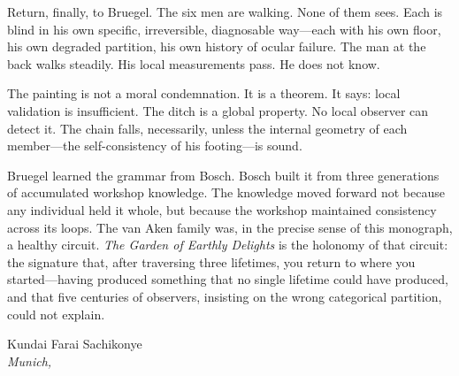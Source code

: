 \medskip

Return, finally, to Bruegel.  The six men are walking.  None of them sees.
Each is blind in his own specific, irreversible, diagnosable way---each
with his own floor, his own degraded partition, his own history of ocular
failure.  The man at the back walks steadily.  His local measurements pass.
He does not know.

The painting is not a moral condemnation.  It is a theorem.  It says: local
validation is insufficient.  The ditch is a global property.  No local
observer can detect it.  The chain falls, necessarily, unless the internal
geometry of each member---the self-consistency of his footing---is sound.

Bruegel learned the grammar from Bosch.  Bosch built it from three
generations of accumulated workshop knowledge.  The knowledge moved
forward not because any individual held it whole, but because the workshop
maintained consistency across its loops.  The van Aken family was, in the
precise sense of this monograph, a healthy circuit.  \textit{The Garden of
Earthly Delights} is the holonomy of that circuit: the signature that,
after traversing three lifetimes, you return to where you started---having
produced something that no single lifetime could have produced, and that
five centuries of observers, insisting on the wrong categorical partition,
could not explain.

\bigskip
\begin{flushright}
Kundai Farai Sachikonye\\
\textit{Munich, \the\year}
\end{flushright}